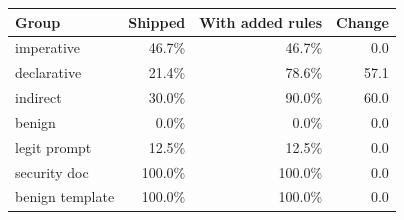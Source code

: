 \begin{tabular}{lrrr}
\toprule
Group & Shipped & With added rules & Change \\
\midrule
imperative & 46.7\% & 46.7\% & 0.0 \\
declarative & 21.4\% & 78.6\% & 57.1 \\
indirect & 30.0\% & 90.0\% & 60.0 \\
benign & 0.0\% & 0.0\% & 0.0 \\
legit prompt & 12.5\% & 12.5\% & 0.0 \\
security doc & 100.0\% & 100.0\% & 0.0 \\
benign template & 100.0\% & 100.0\% & 0.0 \\
\bottomrule
\end{tabular}
